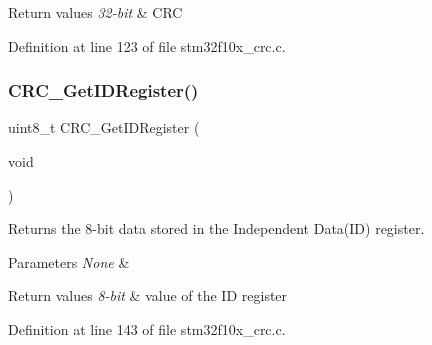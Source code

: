 \begin{DoxyRetVals}{Return values}
{\em 32-\/bit} & C\+RC \\
\hline
\end{DoxyRetVals}


Definition at line 123 of file stm32f10x\+\_\+crc.\+c.

\mbox{\label{group___c_r_c___exported___functions_gaf869f6e9c3ca0ae0822cfad1abea7e5f}} 
\subsubsection{\texorpdfstring{C\+R\+C\+\_\+\+Get\+I\+D\+Register()}{CRC\_GetIDRegister()}}
{\footnotesize\ttfamily uint8\+\_\+t C\+R\+C\+\_\+\+Get\+I\+D\+Register (\begin{DoxyParamCaption}\item[{void}]{ }\end{DoxyParamCaption})}



Returns the 8-\/bit data stored in the Independent Data(\+I\+D) register. 


\begin{DoxyParams}{Parameters}
{\em None} & \\
\hline
\end{DoxyParams}

\begin{DoxyRetVals}{Return values}
{\em 8-\/bit} & value of the ID register \\
\hline
\end{DoxyRetVals}


Definition at line 143 of file stm32f10x\+\_\+crc.\+c.

\mbox{\label{group___c_r_c___exported___functions_ga506467d5ef873a5a4ade4ae83cb110f6}} 
